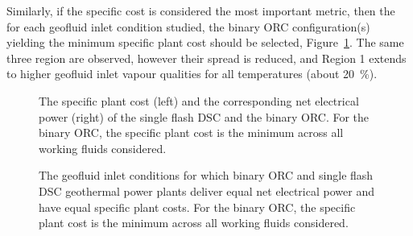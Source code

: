 
    Similarly, if the specific cost is considered the most important metric, then the for each geofluid inlet condition studied, the binary \ac{ORC} configuration(s) yielding the minimum specific plant cost should be selected, Figure~\ref{fig:prosim_purewater_SpecCost_DSC_vs_ORC}. The same three region are observed, however their spread is reduced, and Region 1 extends to higher geofluid inlet vapour qualities for all temperatures (about \qty{20}{\percent}). 


    \begin{figure}[H]
        \centering
        
        \caption[The specific plant cost and the corresponding net electrical power of the single flash \ac{DSC} and the binary \ac{ORC}.]{The specific plant cost (left) and the corresponding net electrical power (right) of the single flash \ac{DSC} and the binary \ac{ORC}. For the binary \ac{ORC}, the specific plant cost is the minimum across all working fluids considered.}
        \label{fig:prosim_purewater_SpecCost_DSC_vs_ORC}
    \end{figure}  

    \begin{figure}[H]
        \centering
        
        \caption[The geofluid inlet conditions for which binary \ac{ORC} and single flash \ac{DSC} geothermal power plants deliver equal net electrical power and have equal specific plant costs.]{The geofluid inlet conditions for which binary \ac{ORC} and single flash \ac{DSC} geothermal power plants deliver equal net electrical power and have equal specific plant costs. For the binary \ac{ORC}, the specific plant cost is the minimum across all working fluids considered.}
        \label{fig:prosim_purewater_Breakeven_SpecCost}
    \end{figure}

